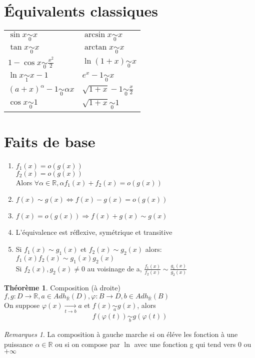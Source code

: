 \documentclass[fleqn]{article}
\theoremstyle{definition} \newtheorem*{defi}{D\'efinition}
\theoremstyle{definition} \newtheorem*{theo}{Th\'eor\`eme}
\theoremstyle{remark} \newtheorem*{rqs}{Remarques}
\begin{document}
\section{\'Equivalents classiques}
\begin{tabular}{@{}ll@{}}
		$\sin x \underset{0}{\sim} x$ & $\arcsin x \underset{0}{\sim} x$ \\
		$\tan x \underset{0}{\sim} x$ & $\arctan x \underset{0}{\sim} x$ \\
		$1 - \cos x \underset{0}{\sim} \frac{x^2}{2}$ & $\ln(1+x) \underset{0}{\sim} x$ \\
		$\ln x \underset{1}{\sim} x-1$ & $e^x -1 \underset{0}{\sim} x$ \\
		$(a+x)^{\alpha} -1 \underset{0}{\sim} \alpha x$ & $\sqrt{1+x} - 1 \underset{0}{\sim} \frac{x}{2}$ \\
		$\cos x \underset{0}{\sim} 1$ & $\sqrt{1+x} \underset{0}{\sim} 1$ \\
\end{tabular}

\section{Faits de base}
\begin{enumerate}
	\item $f_1(x) = o(g(x))$\\
		$f_2(x)	= o(g(x))$ \\
		Alors $\forall \alpha \in \mathbb{R}, \alpha f_1(x) + f_2(x) =  o(g(x))$
	\item $f(x) \sim g(x) \Leftrightarrow f(x) - g(x) = o(g(x))$
	\item $f(x) = o(g(x)) \Rightarrow f(x) + g(x) \sim g(x)$
	\item L'\'equivalence est r\'eflexive, sym\'etrique et transitive
	\item Si $f_1(x) \sim g_1(x)$ et
		$f_2(x) \sim g_2(x)$ alors:\\
		$f_1(x)f_2(x) \sim g_1(x)g_2(x)$ \\Si $f_2(x), g_2(x) \neq 0$ au voisinage de a, $\frac{f_1(x)}{f_2(x)} \sim
		\frac{g_1(x)}{g_2(x)}$
\end{enumerate}

\begin{theo} Composition (\`a droite)\\
	$f,g: D \rightarrow \mathbb{R}, a \in Adh_{\overline{\mathbb{R}}%
	}(D), \varphi: B \rightarrow D, b \in Adh_{\overline{\mathbb{R}}%
	}(B)$ \\
	On suppose $\varphi(x)\underset{t\rightarrow b}{\rightarrow} a$ et $f(x)\underset{a}{\sim} g(x)$, alors
	\[f(\varphi(t))\underset{b}{\sim} g(\varphi(t))\]
\end{theo}

\begin{rqs}
	La composition \`a gauche marche si on \'el\'eve les fonction \`a une puissance $\alpha \in \mathbb{R}$ ou si on compose par $\ln$ avec une
	fonction g qui tend vers $0$ ou $+\infty$
\end{rqs}
\end{document}
